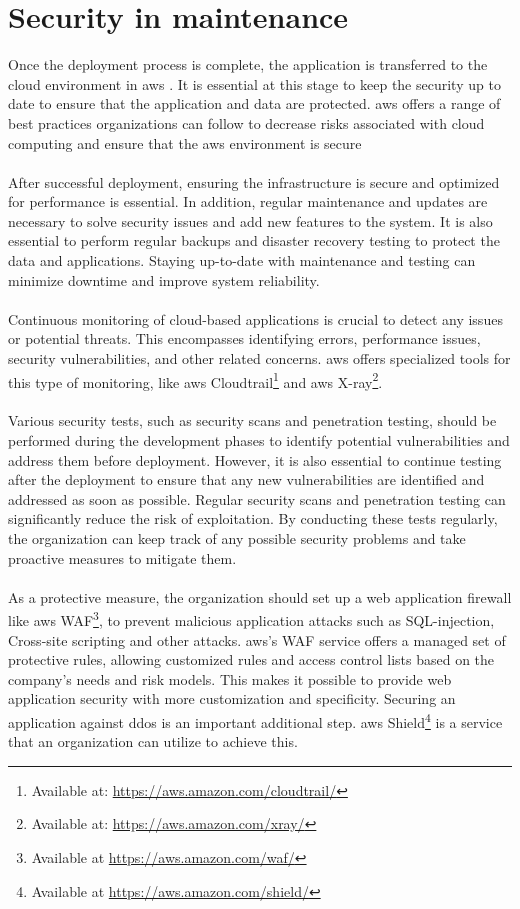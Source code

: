 \section{Security in maintenance}
Once the deployment process is complete, the application is transferred to the cloud environment in \acrlong{aws} \cite{awsafterdep}. It is essential at this stage to keep the security up to date to ensure that the application and data are protected. \acrshort{aws} offers a range of best practices organizations can follow to decrease risks associated with cloud computing and ensure that the  \acrshort{aws} environment is secure 
\\~\\
After successful deployment, ensuring the infrastructure is secure and optimized for performance is essential. In addition, regular maintenance and updates are necessary to solve security issues and add new features to the system. It is also essential to perform regular backups and disaster recovery testing to protect the data and applications. Staying up-to-date with maintenance and testing can minimize downtime and improve system reliability. 
\\~\\
Continuous monitoring of cloud-based applications is crucial to detect any issues or potential threats. This encompasses identifying errors, performance issues, security vulnerabilities, and other related concerns. \acrshort{aws} offers specialized tools for this type of monitoring, like \acrshort{aws} Cloudtrail\footnote{Available at: \url{https://aws.amazon.com/cloudtrail/}} and \acrshort{aws} X-ray\footnote{Available at: \url{https://aws.amazon.com/xray/}}. 
\\~\\
Various security tests, such as security scans and penetration testing, should be performed during the development phases to identify potential vulnerabilities and address them before deployment. However, it is also essential to continue testing after the deployment to ensure that any new vulnerabilities are identified and addressed as soon as possible. Regular security scans and penetration testing can significantly reduce the risk of exploitation. By conducting these tests regularly, the organization can keep track of any possible security problems and take proactive measures to mitigate them.
\\~\\
As a protective measure, the organization should set up a web application firewall like \acrshort{aws} WAF\footnote{Available at \url{https://aws.amazon.com/waf/}}, to prevent malicious application attacks such as \gls{SQL-injection}, \gls{Cross-site scripting} and other attacks. \acrshort{aws}'s WAF service offers a managed set of protective rules, allowing customized rules and access control lists based on the company's needs and risk models. This makes it possible to provide web application security with more customization and specificity. Securing an application against \gls{ddos} is an important additional step. \acrshort{aws} Shield\footnote{Available at \url{https://aws.amazon.com/shield/}} is a service that an organization can utilize to achieve this. 
